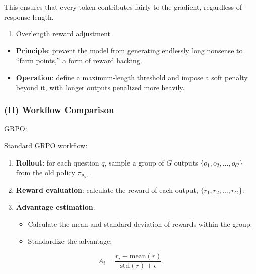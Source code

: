This ensures that every token contributes fairly to the gradient, regardless of response length.

\begin{enumerate}
\def\labelenumi{\arabic{enumi}.}
\setcounter{enumi}{3}
\tightlist
\item
  Overlength reward adjustment
\end{enumerate}

\begin{itemize}
\tightlist
\item
  \textbf{Principle}: prevent the model from generating endlessly long nonsense to ``farm points,'' a form of reward hacking.
\item
  \textbf{Operation}: define a maximum-length threshold and impose a soft penalty beyond it, with longer outputs penalized more heavily.
\end{itemize}

\hypertarget{ii-workflow-comparison}{%
\subsubsection{(II) Workflow Comparison}\label{ii-workflow-comparison}}

GRPO:

Standard GRPO workflow:

\begin{enumerate}
\def\labelenumi{\arabic{enumi}.}
\tightlist
\item
  \textbf{Rollout}: for each question \(q\), sample a group of \(G\) outputs \(\{o_1,o_2,\ldots,o_G\}\) from the old policy \(\pi_{\theta_{\mathrm{old}}}\).
\item
  \textbf{Reward evaluation}: calculate the reward of each output, \(\{r_1,r_2,\ldots,r_G\}\).
\item
{}
  \textbf{Advantage estimation}:

  \begin{itemize}
  \tightlist
  \item
    Calculate the mean and standard deviation of rewards within the group.
  \item
{}
    Standardize the advantage:
  \end{itemize}
\end{enumerate}

\[
A_i
=
\frac{r_i-\mathrm{mean}(r)}
{\mathrm{std}(r)+\epsilon}.
\]


